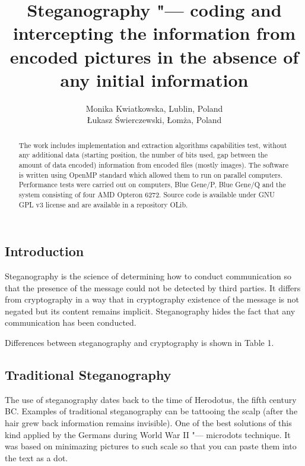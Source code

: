 \documentclass[10pt, a5paper]{article}
\begin{document}
\title{Steganography "--- coding and intercepting the information from encoded pictures in the absence of any initial information}
\author{Monika Kwiatkowska, Lublin, Poland \\ \L{}ukasz \'S{}wierczewski, \L{}om\.z{}a, Poland}
\maketitle
\begin{abstract}
The work includes implementation and extraction algorithms capabilities test, without any additional data (starting position, the number of bits used, gap between the amount of data encoded) information from encoded files (mostly images). The software is written using OpenMP standard which allowed them to run on parallel computers. Performance tests were carried out on computers, Blue Gene/P, Blue Gene/Q and the system consisting of four AMD Opteron 6272. Source code is available under GNU GPL v3 license and are available in a repository OLib.
\end{abstract}
\subsection*{Introduction}

Steganography is the science of determining how to conduct commu\-ni\-ca\-tion so that the presence of the message could not be detected by third parties. It differs from cryptography in a way that in cryptography existence of the message is not negated but its content remains implicit. Steganography hides the fact that any communication has been con\-duct\-ed.

Differences between steganography and cryptography is shown in Table 1.

\subsection*{Traditional Steganography}
The use of steganography dates back to the time of Herodotus, the fifth century BC. Examples of traditional steganography can be tattooing the scalp (after the hair grew back information remains in\-vi\-sible). One of the best solutions of this kind applied by the Germans during World War II "--- microdots technique. It was based on minimazing  pictures to such scale so that you can paste them into the text as a dot.
\end{document}
